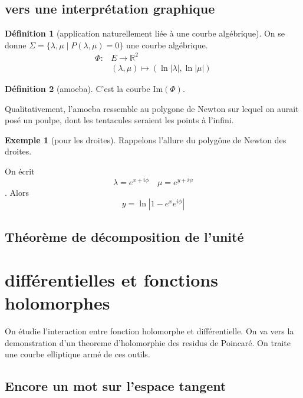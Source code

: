 \documentclass{article}
\newcommand{\R}{\mathbb{R}} %
\theoremstyle{definition} %
\newtheorem{defi}{Définition}
\newtheorem{ex}{Exemple}
\newcommand{\1}{\mathbb{1}} %
\begin{document}
\subsection{vers une interprétation graphique}

\begin{defi}[application naturellement liée à une courbe algébrique]
On se donne $\Sigma=\{ \lambda ,\mu \mid P(\lambda,\mu)=0 \}$ une courbe algébrique.
\begin{align*}
\Phi : & E \to \R^2 \\
& (\lambda,\mu) \mapsto (\ln |\lambda|,\ln |\mu|)
\end{align*}

\end{defi}

\begin{defi}[amoeba]
C'est la courbe $\mathrm{Im} (\Phi)$.

\end{defi}

Qualitativement, l'amoeba ressemble au polygone de Newton sur lequel on aurait posé un poulpe, dont les tentacules seraient les points à l'infini.

\begin{ex}[pour les droites]
Rappelons l'allure du polygône de Newton des droites.

On écrit $$\lambda = e^{x+i \phi} \quad \mu=e^{y+i \psi}$$.
Alors $$y=\ln |1 - e^x e^{i \phi}|$$
\end{ex}

\subsection{Théorème de décomposition de l'unité}




\section{différentielles et fonctions holomorphes}

On étudie l'interaction entre fonction holomorphe et différentielle.
On va vers la demonstration d'un theoreme d'holomorphie des residus de Poincaré.
On traite une courbe elliptique armé de ces outils.

\subsection{Encore un mot sur l'espace tangent}
\end{document}
